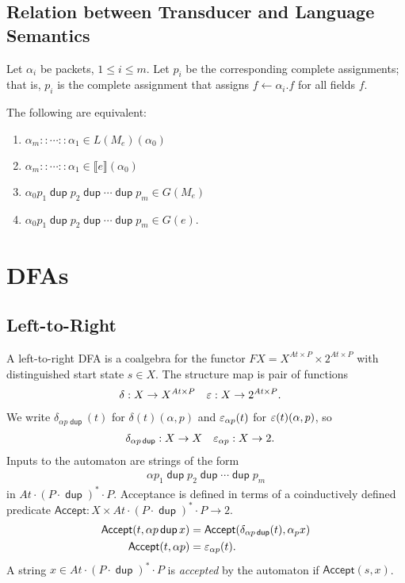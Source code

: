\documentclass{article}
\newcommand\den[1]{\llbracket #1\rrbracket}
\newcommand\At{\ensuremath{\mathit{At}}}
\newcommand\pdup{\mathop{\mathsf{dup}}}
\renewcommand\star{^{\textstyle *}}
\newcommand\acc{\mathsf{Accept}}
\begin{document}
\subsection*{Relation between Transducer and Language Semantics}

Let $\alpha_i$ be packets, $1\leq i\leq m$. Let $p_i$ be the corresponding complete assignments; that is, $p_i$ is the complete assignment that assigns $f\leftarrow\alpha_i.f$ for all fields $f$.

\begin{theorem}
The following are equivalent:
\begin{enumerate}
\romanize
\item
$\alpha_m::\cdots::\alpha_1 \in L(M_e)(\alpha_0)$
\item
$\alpha_m::\cdots::\alpha_1 \in \den{e}(\alpha_0)$
\item
$\alpha_0 p_1 \pdup p_2 \pdup \cdots \pdup p_m \in G(M_e)$
\item
$\alpha_0 p_1 \pdup p_2 \pdup \cdots \pdup p_m \in G(e)$.
\end{enumerate}
\end{theorem}

\section*{DFAs}

\subsection*{Left-to-Right}

A left-to-right DFA is a coalgebra for the functor $FX = X^{\At\times P}\times 2^{\At\times P}$ with distinguished start state $s\in X$. The structure map is pair of functions
\begin{align*}
\delta &: X\to X^{\At\times P} & \eps &: X\to 2^{\At\times P}.
\end{align*}
We write $\delta_{\alpha p\pdup}(t)$ for $\delta(t)(\alpha,p)$ and $\varepsilon_{\alpha p}(t)$ for $\varepsilon(t)(\alpha,p)$, so
\begin{align*}
\delta_{\alpha p\pdup} &: X\to X & \eps_{\alpha p} &: X\to 2.
\end{align*}
Inputs to the automaton are strings of the form
\begin{align*}
\alpha p_1\pdup p_2\pdup\cdots\pdup p_m
\end{align*}
in $\At\cdot(P\cdot\pdup)\star\cdot P$. Acceptance is defined in terms of a coinductively defined predicate $\acc:X\times\At\cdot(P\cdot\pdup)\star\cdot P\to 2$.
\begin{align*}
\acc(t,\alpha p\pdup x) &= \acc(\delta_{\alpha p\pdup}(t),\alpha_p x)\\
\acc(t,\alpha p) &= \eps_{\alpha p}(t).
\end{align*}
A string $x\in\At\cdot(P\cdot\pdup)\star\cdot P$ is \emph{accepted} by the automaton if $\acc(s,x)$.
\end{document}
